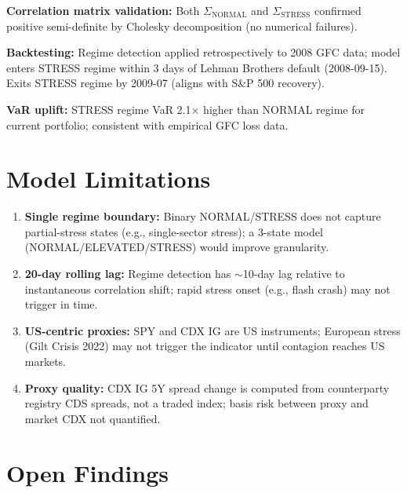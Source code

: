 \documentclass{apex_mdd}
\begin{document}
\textbf{Correlation matrix validation:} Both $\Sigma_{\mathrm{NORMAL}}$ and $\Sigma_{\mathrm{STRESS}}$ confirmed positive semi-definite by Cholesky decomposition (no numerical failures).

\textbf{Backtesting:} Regime detection applied retrospectively to 2008 GFC data; model enters STRESS regime within 3 days of Lehman Brothers default (2008-09-15). Exits STRESS regime by 2009-07 (aligns with S\&P 500 recovery).

\textbf{VaR uplift:} STRESS regime VaR 2.1$\times$ higher than NORMAL regime for current portfolio; consistent with empirical GFC loss data.

\section{Model Limitations}

\begin{enumerate}
  \item \textbf{Single regime boundary:} Binary NORMAL/STRESS does not capture partial-stress states (e.g., single-sector stress); a 3-state model (NORMAL/ELEVATED/STRESS) would improve granularity.
  \item \textbf{20-day rolling lag:} Regime detection has $\sim$10-day lag relative to instantaneous correlation shift; rapid stress onset (e.g., flash crash) may not trigger in time.
  \item \textbf{US-centric proxies:} SPY and CDX IG are US instruments; European stress (Gilt Crisis 2022) may not trigger the indicator until contagion reaches US markets.
  \item \textbf{Proxy quality:} CDX IG 5Y spread change is computed from counterparty registry CDS spreads, not a traded index; basis risk between proxy and market CDX not quantified.
\end{enumerate}

\section{Open Findings}

\begin{findings}
\end{findings}
\end{document}
